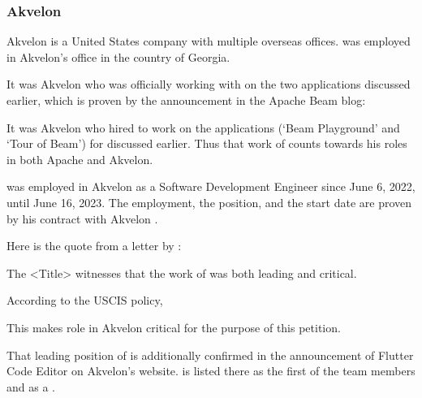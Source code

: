 \subsubsection{Akvelon}
\label{subsubsec:RoleAkvelon}


Akvelon is a United States company with multiple overseas offices.
\mrl was employed in Akvelon's office in the country of Georgia.

It was Akvelon who was officially working with \Asf on the two applications
discussed earlier, which is proven by the announcement in the Apache Beam blog:


It was Akvelon who hired \mrl to work on the applications (`Beam Playground' and `Tour of Beam')
for \Asf discussed earlier.
Thus that work of \mrl counts towards his roles in both Apache and Akvelon.


\mrl was employed in Akvelon as a Software Development Engineer since June 6, 2022, until June 16, 2023.
The employment, the position, and the start date are proven by his contract with Akvelon .



Here is the quote from a letter by \MrAkvelonT:


The <Title> witnesses that the work of \mrl was both leading and critical.

According to the USCIS policy,


This makes \mrls role in Akvelon critical for the purpose of this petition.

That leading position of \mrl is additionally confirmed in the announcement of Flutter Code Editor
on Akvelon's website. \mrl is listed there as the first of the team members
and as a  .

